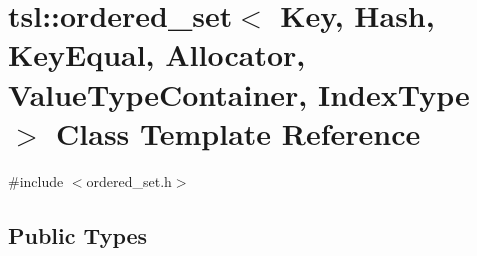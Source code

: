 \hypertarget{classtsl_1_1ordered__set}{}\section{tsl\+::ordered\+\_\+set$<$ Key, Hash, Key\+Equal, Allocator, Value\+Type\+Container, Index\+Type $>$ Class Template Reference}
\label{classtsl_1_1ordered__set}


{\ttfamily \#include $<$ordered\+\_\+set.\+h$>$}

\subsection*{Public Types}
